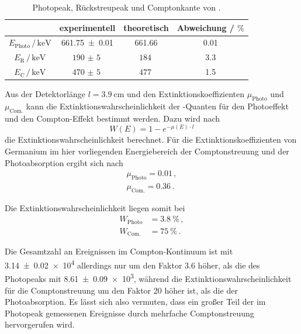 \begin{table}[H]
  \centering
  \caption{Photopeak, Rückstreupeak und Comptonkante von .}
  \label{tab:Cs_Comptonkontinuum}
  \begin{tabular}{cccc}
    \toprule
    & experimentell & theoretisch & Abweichung / $\si{\percent}$ \\
    \midrule
    $E_\text{Photo} \, / \, \si{\kilo\electronvolt}$ & \SI{661.75(1)}{} & \num{661.66} & \num{0.01} \\
    $E_\text{R} \,/\, \si{\kilo\electronvolt}$ &  $\SI{190(5)}{}$ & $\SI{184}{}$ & \num{3.3} \\
    $E_\text{C} \,/\, \si{\kilo\electronvolt}$ &  $\SI{470(5)}{}$ & $\SI{477}{}$ & \num{1.5} \\
    \bottomrule
  \end{tabular}
\end{table}

Aus der Detektorlänge $l= \SI{3.9}{\centi\meter}$ und den Extinktionskoeffizienten $\mu_\text{Photo}$ und $\mu_\text{Com.}$ kann die Extinktionswahrscheinlichkeit der -Quanten für den Photoeffekt und den Compton-Effekt bestimmt werden.
Dazu wird nach
\begin{equation*}
  W(E) = 1 - e^{-\mu(E) \cdot l}
\end{equation*}
die Extinktionswahrscheinlichkeit berechnet.
Für die Extinktionskoeffizienten von Germanium im hier vorliegenden Energiebereich der Comptonstreuung und der Photoabsorption ergibt sich nach \cite{nist}
\begin{align*}
  \mu_\text{Photo} = 0.01 \, , \\
  \mu_\text{Com.} = 0.36 \, .
\end{align*}

Die Extinktionswahrscheinlichkeit liegen somit bei
\begin{align*}
  W_\text{Photo} &= \SI{3.8}{\percent} \, , \\
  W_\text{Com.} &= \SI{75}{\percent} \, .
\end{align*}

Die Gesamtzahl an Ereignissen im Compton-Kontinuum ist mit \num{3.14(2)e4} allerdings nur um den Faktor \num{3.6} höher, als die des Photopeaks mit \num{8.61(9)e3}, während die Extinktionswahrscheinlichkeit für die Comptonstreuung um den Faktor 20 höher ist, als die der Photoabsorption.
Es lässt sich also vermuten, dass ein großer Teil der im Photopeak gemessenen Ereignisse durch mehrfache Comptonstreuung hervorgerufen wird.

